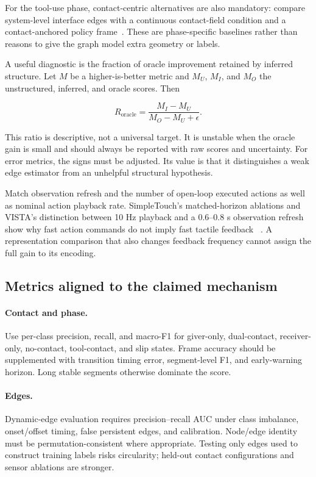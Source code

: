 For the tool-use phase, contact-centric alternatives are also mandatory: compare
system-level interface edges with a continuous contact-field condition and a
contact-anchored policy frame~\cite{ma2026semanticcontact,cui2026contactanchored}.
These are phase-specific baselines rather than reasons to give the graph model
extra geometry or labels.

A useful diagnostic is the fraction of oracle improvement retained by inferred
structure. Let $M$ be a higher-is-better metric and $M_U$, $M_I$, and $M_O$ the
unstructured, inferred, and oracle scores. Then

\begin{equation}
R_{\mathrm{oracle}}=
\frac{M_I-M_U}{M_O-M_U+\epsilon}.
\label{eq:oracle_retention}
\end{equation}

This ratio is descriptive, not a universal target. It is unstable when the oracle
gain is small and should always be reported with raw scores and uncertainty. For
error metrics, the signs must be adjusted. Its value is that it distinguishes a
weak edge estimator from an unhelpful structural hypothesis.

Match observation refresh and the number of open-loop executed actions as well
as nominal action playback rate. SimpleTouch's matched-horizon ablations and
VISTA's distinction between 10 Hz playback and a 0.6--0.8 s observation refresh
show why fast action commands do not imply fast tactile feedback
~\cite{yang2026simpletouch,wong2026vista}. A representation comparison that also
changes feedback frequency cannot assign the full gain to its encoding.

\subsection{Metrics aligned to the claimed mechanism}

\paragraph{Contact and phase.}
Use per-class precision, recall, and macro-F1 for giver-only, dual-contact,
receiver-only, no-contact, tool-contact, and slip states. Frame accuracy should be
supplemented with transition timing error, segment-level F1, and early-warning
horizon. Long stable segments otherwise dominate the score.

\paragraph{Edges.}
Dynamic-edge evaluation requires precision--recall AUC under class imbalance,
onset/offset timing, false persistent edges, and calibration. Node/edge identity
must be permutation-consistent where appropriate. Testing only edges used to
construct training labels risks circularity; held-out contact configurations and
sensor ablations are stronger.

